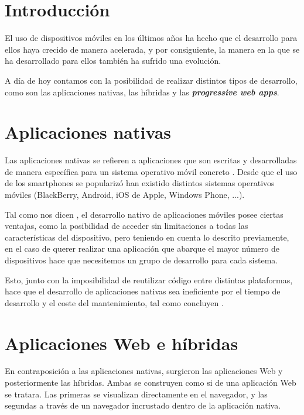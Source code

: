 \documentclass{\ClassPath/viu-tfm-template}
\begin{document}
    \graphicspath{{../VIU_TFM_LaTeX_template/}}

    \coverpage

\chapter{Introducción}

El uso de dispositivos móviles en los últimos años ha hecho que el desarrollo para ellos haya crecido de manera acelerada, y por consiguiente, la manera en la que se ha desarrollado para ellos también ha sufrido una evolución.

A día de hoy contamos con la posibilidad de realizar distintos tipos de desarrollo, como son las aplicaciones nativas, las híbridas y las \textbf{\textit{progressive web apps}}.

\chapter{Aplicaciones nativas}

Las aplicaciones nativas se refieren a aplicaciones que son escritas y desarrolladas de manera específica para un sistema operativo móvil concreto \parencite{Jobe_2013}. Desde que el uso de los smartphones se popularizó han existido distintos sistemas operativos móviles (BlackBerry, Android, iOS de Apple, Windows Phone, ...).

Tal como nos dicen \textcite{thomas_2020}, el desarrollo nativo de aplicaciones móviles posee ciertas ventajas, como la posibilidad de acceder sin limitaciones a todas las características del dispositivo, pero teniendo en cuenta lo descrito previamente, en el caso de querer realizar una aplicación que abarque el mayor número de dispositivos hace que necesitemos un grupo de desarrollo para cada sistema.

Esto, junto con la imposibilidad de reutilizar código entre distintas plataformas, hace que el desarrollo de aplicaciones nativas sea ineficiente por el tiempo de desarrollo y el coste del mantenimiento, tal como concluyen \textcite{xanthopoulos2013comparative}.


\chapter{Aplicaciones Web e híbridas}

En contraposición a las aplicaciones nativas, surgieron las aplicaciones Web y posteriormente las híbridas. Ambas se construyen como si de una aplicación Web se tratara. Las primeras se visualizan directamente en el navegador, y las segundas a través de un navegador incrustado dentro de la aplicación nativa.
\end{document}
